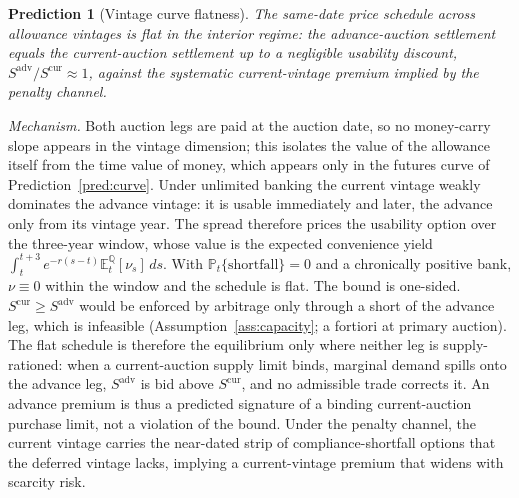 \documentclass[11pt,letterpaper]{article}
\theoremstyle{plain}
\newtheorem{prediction}{Prediction}[section]
\theoremstyle{definition}
\newcommand{\E}{\mathbb{E}}                  %
\newcommand{\Prob}{\mathbb{P}}               %
\newcommand{\Qmeasure}{\mathbb{Q}}           %
\numberwithin{equation}{section}
\begin{document}
\begin{prediction}[Vintage curve flatness]\label{pred:vintage}
The same-date price schedule across allowance vintages is flat in the interior regime: the advance-auction settlement equals the current-auction settlement up to a negligible usability discount, $S^{\mathrm{adv}}/S^{\mathrm{cur}}\approx 1$, against the systematic current-vintage premium implied by the penalty channel.
\end{prediction}

\noindent\emph{Mechanism.} Both auction legs are paid at the auction date, so no money-carry slope appears in the vintage dimension; this isolates the value of the allowance itself from the time value of money, which appears only in the futures curve of Prediction~\ref{pred:curve}. Under unlimited banking the current vintage weakly dominates the advance vintage: it is usable immediately and later, the advance only from its vintage year. The spread therefore prices the usability option over the three-year window, whose value is the expected convenience yield $\int_t^{t+3}e^{-r(s-t)}\E_t^{\Qmeasure}[\nu_s]\,ds$. With $\Prob_t\{\text{shortfall}\}=0$ and a chronically positive bank, $\nu\equiv 0$ within the window and the schedule is flat. The bound is one-sided. $S^{\mathrm{cur}}\geq S^{\mathrm{adv}}$ would be enforced by arbitrage only through a short of the advance leg, which is infeasible (Assumption~\ref{ass:capacity}; a fortiori at primary auction). The flat schedule is therefore the equilibrium only where neither leg is supply-rationed: when a current-auction supply limit binds, marginal demand spills onto the advance leg, $S^{\mathrm{adv}}$ is bid above $S^{\mathrm{cur}}$, and no admissible trade corrects it. An advance premium is thus a predicted signature of a binding current-auction purchase limit, not a violation of the bound. Under the penalty channel, the current vintage carries the near-dated strip of compliance-shortfall options that the deferred vintage lacks, implying a current-vintage premium that widens with scarcity risk.
\end{document}
